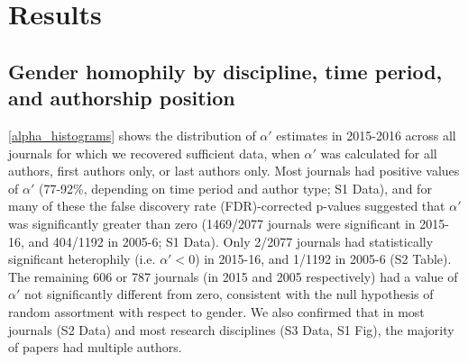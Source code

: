 \documentclass[12pt,]{article}
\begin{document}
\section{Results}\label{results}

\subsection{Gender homophily by discipline, time period, and authorship
position}\label{gender-homophily-by-discipline-time-period-and-authorship-position}

\autoref{alpha_histograms} shows the distribution of \(\alpha'\)
estimates in 2015-2016 across all journals for which we recovered
sufficient data, when \(\alpha'\) was calculated for all authors, first
authors only, or last authors only. Most journals had positive values of
\(\alpha'\) (77-92\%, depending on time period and author type; S1
Data), and for many of these the false discovery rate (FDR)-corrected
p-values suggested that \(\alpha'\) was significantly greater than zero
(1469/2077 journals were significant in 2015-16, and 404/1192 in 2005-6;
S1 Data). Only 2/2077 journals had statistically significant heterophily
(i.e. \(\alpha' < 0\)) in 2015-16, and 1/1192 in 2005-6 (S2 Table). The
remaining 606 or 787 journals (in 2015 and 2005 respectively) had a
value of \(\alpha'\) not significantly different from zero, consistent
with the null hypothesis of random assortment with respect to gender. We
also confirmed that in most journals (S2 Data) and most research
disciplines (S3 Data, S1 Fig), the majority of papers had multiple
authors.
\end{document}
